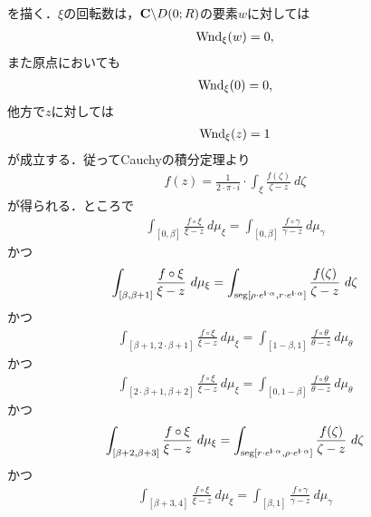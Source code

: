 	を描く．$\xi$の回転数は，$\mathbf{C} \backslash D(0;R)$の要素$w$に対しては
	\begin{align}
		\operatorname{Wnd}_{\xi}(w) = 0,
		\label{fom:Laurent_series_2}
	\end{align}
	また原点においても
	\begin{align}
		\operatorname{Wnd}_{\xi}(0) = 0,
		\label{fom:Laurent_series_3}
	\end{align}
	他方で$z$に対しては
	\begin{align}
		\operatorname{Wnd}_{\xi}(z) = 1
		\label{fom:Laurent_series_4}
	\end{align}
	が成立する．従ってCauchyの積分定理より
	\begin{align}
		f(z) = \frac{1}{2 \cdot \pi \cdot i} \cdot \int_{\xi} \frac{f(\zeta)}{\zeta - z}\ d\zeta
	\end{align}
	が得られる．ところで
	\begin{align}
		\int_{[0,\beta]} \frac{f \circ \xi}{\xi - z}\ d\mu_{\xi} 
		= \int_{[0,\beta]} \frac{f \circ \gamma}{\gamma - z}\ d\mu_{\gamma}
		\label{fom:Laurent_series_5}
	\end{align}
	かつ
	\begin{align}
		\int_{[\beta,\beta+1]} \frac{f \circ \xi}{\xi - z}\ d\mu_{\xi}
		= \int_{\operatorname{seg}[\rho \cdot e^{\mathbf{i} \cdot \alpha},r \cdot e^{\mathbf{i} \cdot \alpha}]} \frac{f(\zeta)}{\zeta - z}\ d\zeta
		\label{fom:Laurent_series_6}
	\end{align}
	かつ
	\begin{align}
		\int_{[\beta+1,2\cdot\beta+1]} \frac{f \circ \xi}{\xi - z}\ d\mu_{\xi}
		= \int_{[1-\beta,1]} \frac{f \circ \theta}{\theta - z}\ d\mu_{\theta}
		\label{fom:Laurent_series_7}
	\end{align}
	かつ
	\begin{align}
		\int_{[2\cdot\beta+1,\beta+2]} \frac{f \circ \xi}{\xi - z}\ d\mu_{\xi}
		= \int_{[0,1-\beta]} \frac{f \circ \theta}{\theta - z}\ d\mu_{\theta}
		\label{fom:Laurent_series_8}
	\end{align}
	かつ
	\begin{align}
		\int_{[\beta+2,\beta+3]} \frac{f \circ \xi}{\xi - z}\ d\mu_{\xi}
		= \int_{\operatorname{seg}[r \cdot e^{\mathbf{i} \cdot \alpha},\rho \cdot e^{\mathbf{i} \cdot \alpha}]} \frac{f(\zeta)}{\zeta - z}\ d\zeta
		\label{fom:Laurent_series_9}
	\end{align}
	かつ
	\begin{align}
		\int_{[\beta+3,4]} \frac{f \circ \xi}{\xi - z}\ d\mu_{\xi}
		= \int_{[\beta,1]} \frac{f \circ \gamma}{\gamma - z}\ d\mu_{\gamma}
		\label{fom:Laurent_series_10}
	\end{align}
